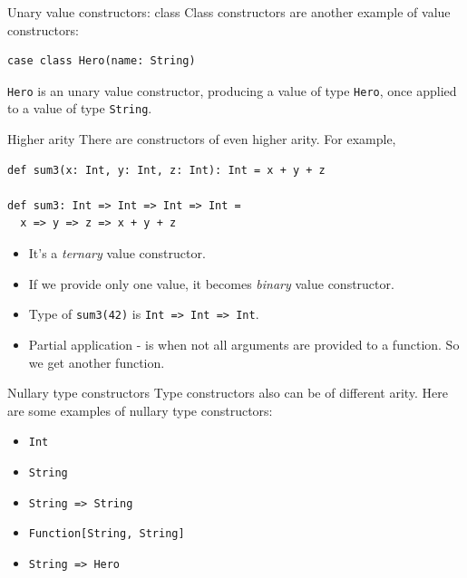 \documentclass[presentation,aspectratio=169,smaller]{beamer}
\begin{document}
\begin{frame}[label={sec:org909cd5f},fragile]{Unary value constructors: class}
 Class constructors are another example of value constructors:

\begin{verbatim}
case class Hero(name: String)
\end{verbatim}

\texttt{Hero} is an unary value constructor, producing a value of type \texttt{Hero}, once
applied to a value of type \texttt{String}.
\end{frame}

\begin{frame}[label={sec:org9974302},fragile]{Higher arity}
 There are constructors of even higher arity. For example,

\begin{verbatim}
def sum3(x: Int, y: Int, z: Int): Int = x + y + z

def sum3: Int => Int => Int => Int =
  x => y => z => x + y + z
\end{verbatim}

\pause

\begin{itemize}
\item <2-> It's a \emph{ternary} value constructor.
\item <3-> If we provide only one value, it becomes \emph{binary} value constructor.
\item <4-> Type of \texttt{sum3(42)} is \texttt{Int => Int => Int}.
\item <5-> \alert{Partial application} - is when not all arguments are provided to a
function. So we get another function.
\end{itemize}
\end{frame}

\begin{frame}[label={sec:org9eebcf6},fragile]{Nullary type constructors}
 Type constructors also can be of different arity. Here are some examples of
nullary type constructors:

\begin{itemize}
\item \texttt{Int}
\item \texttt{String}
\item \texttt{String => String}
\item \texttt{Function[String, String]}
\item \texttt{String => Hero}
\end{itemize}
\end{frame}
\end{document}
